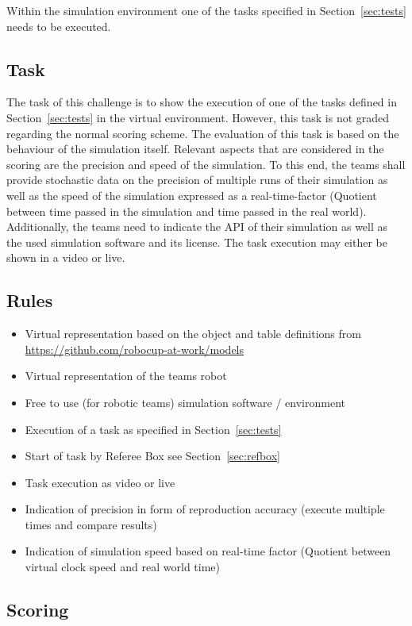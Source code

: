   Within the simulation environment one of the tasks specified in Section~\ref{sec:tests} needs to be executed.

\subsection{Task}

The task of this challenge is to show the execution of one of the tasks defined in Section~\ref{sec:tests} in the virtual environment. However, this task is not graded regarding the normal scoring scheme. The evaluation of this task is based on the behaviour of the simulation itself. Relevant aspects that are considered in the scoring are the precision and speed of the simulation. To this end, the teams shall provide stochastic data on the precision of multiple runs of their simulation  as well as the speed of the simulation expressed as a real-time-factor (Quotient between time passed in the simulation and time passed in the real world). Additionally, the teams need to indicate the API of their simulation as well as the used simulation software and its license. The task execution may either be shown in a video or live. 

\subsection{Rules}

\begin{itemize}
  \item Virtual representation based on the object and table definitions from \url{https://github.com/robocup-at-work/models}
  \item Virtual representation of the teams robot
  \item Free to use (for robotic teams) simulation software / environment
  \item Execution of a task as specified in Section~\ref{sec:tests}
  \item Start of task by Referee Box see Section~\ref{sec:refbox}
  \item Task execution as video or live
  \item Indication of precision in form of reproduction accuracy (execute multiple times and compare results)
  \item Indication of simulation speed based on real-time factor (Quotient between virtual clock speed and real world time)
\end{itemize}

\subsection{Scoring}

